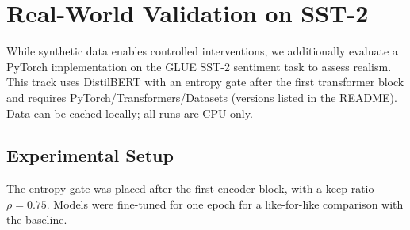 \documentclass{article}
\begin{document}
\begin{table}[t]
\centering
\caption{Synthetic validation. Relative FLOPs are two-layer attention proxies; latency uses a dimensionless analytic proxy.}
\label{tab:main}
\end{table}



\section{Real-World Validation on SST-2}
\label{sec:sst2}
While synthetic data enables controlled interventions, we additionally evaluate a PyTorch implementation on the GLUE SST-2 sentiment task to assess realism. This track uses DistilBERT with an entropy gate after the first transformer block and requires PyTorch/Transformers/Datasets (versions listed in the README). Data can be cached locally; all runs are CPU-only.

\subsection{Experimental Setup}
The entropy gate was placed after the first encoder block, with a keep ratio $\rho=0.75$. Models were fine-tuned for one epoch for a like-for-like comparison with the baseline.
\end{document}
